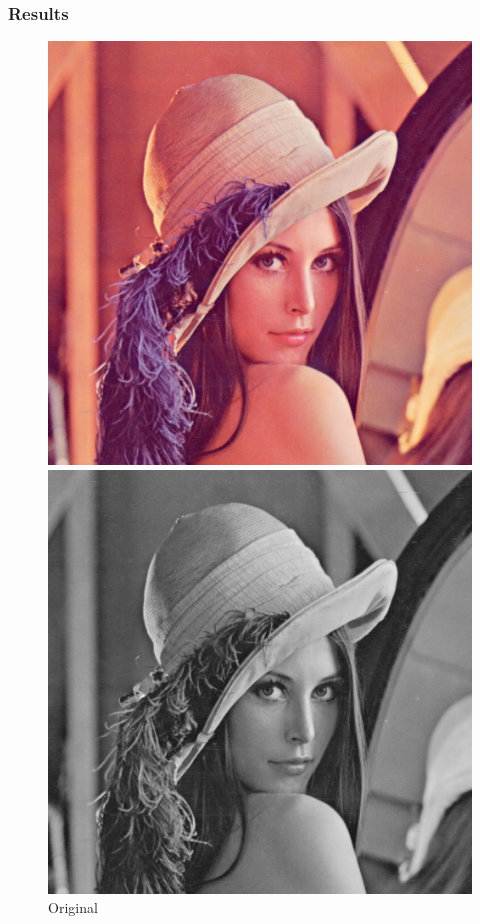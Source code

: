 \documentclass[11pt,a4paper]{article}
\begin{document}
\subsubsection*{Results}
\begin{figure}[ht!]
    \centering
    \begin{minipage}{0.3\textwidth}
        \centering
        \includegraphics[width=\linewidth]{figs/lenna.png}
        \caption{Original}
    \end{minipage}
    \quad
    \begin{minipage}{0.3\textwidth}
        \centering
        \includegraphics[width=\linewidth]{figs/task4/gray.png}

\end{minipage}
\end{figure}
\end{document}
